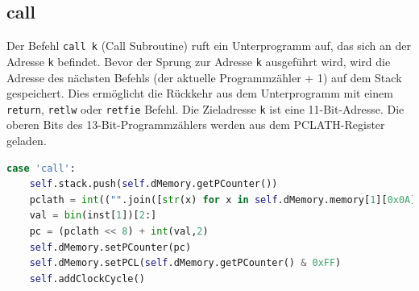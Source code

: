 \subsection{call}
Der Befehl \texttt{call k} (Call Subroutine) ruft ein Unterprogramm auf, das sich an der Adresse \texttt{k} befindet. Bevor der Sprung zur Adresse \texttt{k} ausgeführt wird, wird die Adresse des nächsten Befehls (der aktuelle Programmzähler + 1) auf dem Stack gespeichert. Dies ermöglicht die Rückkehr aus dem Unterprogramm mit einem \texttt{return}, \texttt{retlw} oder \texttt{retfie} Befehl. Die Zieladresse \texttt{k} ist eine 11-Bit-Adresse. Die oberen Bits des 13-Bit-Programmzählers werden aus dem PCLATH-Register geladen.

\begin{lstlisting}[language=Python, caption={Ausschnitt der CALL-Befehlsimplementierung im \acl{CPU} Modul}, label={lst:call}]
case 'call':
    self.stack.push(self.dMemory.getPCounter())
    pclath = int(("".join([str(x) for x in self.dMemory.memory[1][0x0A]])[3:5]),2) << 3
    val = bin(inst[1])[2:]
    pc = (pclath << 8) + int(val,2)
    self.dMemory.setPCounter(pc)
    self.dMemory.setPCL(self.dMemory.getPCounter() & 0xFF)
    self.addClockCycle()
\end{lstlisting}

